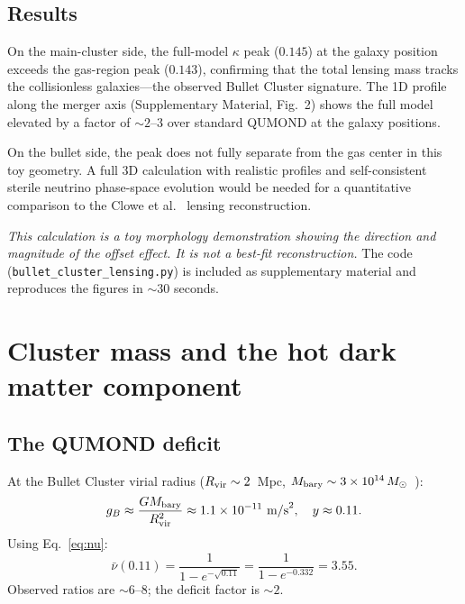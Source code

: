 \documentclass[aps,prd,twocolumn,superscriptaddress,nofootinbib]{revtex4-2}
\begin{document}
\subsection{Results}

On the main-cluster side, the full-model $\kappa$ peak ($0.145$) at the galaxy position exceeds the gas-region peak ($0.143$), confirming that the total lensing mass tracks the collisionless galaxies---the observed Bullet Cluster signature. The 1D profile along the merger axis (Supplementary Material, Fig.~2) shows the full model elevated by a factor of $\sim 2$--$3$ over standard QUMOND at the galaxy positions.

On the bullet side, the peak does not fully separate from the gas center in this toy geometry. A full 3D calculation with realistic profiles and self-consistent sterile neutrino phase-space evolution would be needed for a quantitative comparison to the Clowe et al.~\cite{Clowe2006} lensing reconstruction.

\emph{This calculation is a toy morphology demonstration showing the direction and magnitude of the offset effect. It is not a best-fit reconstruction.} The code (\texttt{bullet\_cluster\_lensing.py}) is included as supplementary material and reproduces the figures in $\sim 30$ seconds.

\section{Cluster mass and the hot dark matter component}
\label{sec:neutrinos}

\subsection{The QUMOND deficit}

At the Bullet Cluster virial radius ($R_{\rm vir}\sim 2$~Mpc, $M_{\rm bary}\sim 3\times 10^{14}\,M_\odot$~\cite{Clowe2006,Bradac2006}):
\begin{equation}
g_B\approx\frac{GM_{\rm bary}}{R_{\rm vir}^2}\approx 1.1\times 10^{-11}~\text{m/s}^2,\quad y\approx 0.11.
\label{eq:gcluster}
\end{equation}
Using Eq.~\eqref{eq:nu}:
\begin{equation}
\bar{\nu}(0.11)=\frac{1}{1-e^{-\sqrt{0.11}}}=\frac{1}{1-e^{-0.332}}=3.55.
\label{eq:nucluster}
\end{equation}
Observed ratios are $\sim 6$--$8$; the deficit factor is $\sim 2$.
\end{document}
